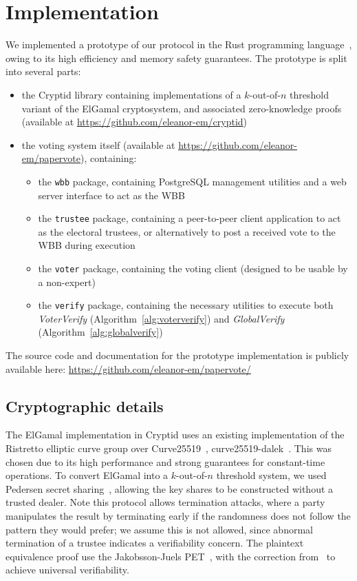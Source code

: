 \documentclass[12pt,a4paper]{article}
\theoremstyle{definition}
\begin{document}
\section{Implementation}\label{sec-impl}
We implemented a prototype of our protocol in the Rust programming language~\cite{klabnik2019rust}, owing to its high efficiency and memory safety guarantees. The prototype is split into several parts:
\begin{itemize}
    \item the Cryptid library containing implementations of a $k$-out-of-$n$ threshold variant of the ElGamal cryptosystem, and associated zero-knowledge proofs (available at \url{https://github.com/eleanor-em/cryptid})
    \item the voting system itself (available at \url{https://github.com/eleanor-em/papervote}), containing:
        \begin{itemize}
            \item the \texttt{wbb} package, containing PostgreSQL management utilities and a web server interface to act as the WBB
            \item the \texttt{trustee} package, containing a peer-to-peer client application to act as the electoral trustees, or alternatively to post a received vote to the WBB during execution
            \item the \texttt{voter} package, containing the voting client (designed to be usable by a non-expert)
            \item the \texttt{verify} package, containing the necessary utilities to execute both \textit{VoterVerify} (Algorithm~\ref{alg:voterverify}) and \textit{GlobalVerify} (Algorithm~\ref{alg:globalverify})
        \end{itemize}
\end{itemize}
The source code and documentation for the prototype implementation is publicly available here: \url{https://github.com/eleanor-em/papervote/}

\subsection{Cryptographic details}\label{sec:prototype-crypto}
The ElGamal implementation in Cryptid uses an existing implementation of the Ristretto elliptic curve group over Curve25519~\cite{hamburg2015decaf}, curve25519-dalek~\cite{curve25519dalek}. This was chosen due to its high performance and strong guarantees for constant-time operations. To convert ElGamal into a $k$-out-of-$n$ threshold system, we used Pedersen secret sharing~\cite{pedersen1991threshold}, allowing the key shares to be constructed without a trusted dealer. Note this protocol allows termination attacks, where a party manipulates the result by terminating early if the randomness does not follow the pattern they would prefer; we assume this is not allowed, since abnormal termination of a trustee indicates a verifiability concern. The plaintext equivalence proof use the Jakobsson-Juels PET~\cite{jakobsson2000mix}, with the correction from~\cite{mcmurtry2020test} to achieve universal verifiability.
\end{document}
